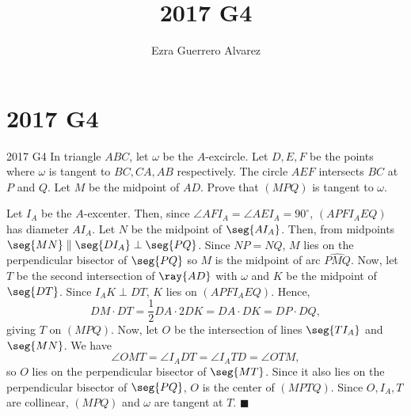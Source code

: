 \documentclass[14pt]{article}
\title{2017 G4}
\author{Ezra Guerrero Alvarez}
\begin{document}
\maketitle
	
\section*{2017 G4}

\begin{statement}{2017 G4}
	In triangle $ABC$, let $\omega$ be the $A$-excircle. Let $D,E,F$ be the points where $\omega$ is tangent to $BC,CA,AB$ respectively. The circle $AEF$ intersects $BC$ at $P$ and $Q$. Let $M$ be the midpoint of $AD$. Prove that $(MPQ)$ is tangent to $\omega$.
\end{statement}
Let $I_A$ be the $A$-excenter. Then, since $\angle AFI_A=\angle AEI_A=90^{\circ}$, $(APFI_AEQ)$ has diameter $AI_A$. Let $N$ be the midpoint of $\seg{AI_A}$. Then, from midpoints $\seg{MN}\parallel\seg{DI_A}\perp\seg{PQ}$. Since $NP=NQ$, $M$ lies on the perpendicular bisector of $\seg{PQ}$ so $M$ is the midpoint of arc $\widehat{PMQ}$. Now, let $T$ be the second intersection of $\ray{AD}$ with $\omega$ and $K$ be the midpoint of $\seg{DT}$. Since $I_AK\perp DT$, $K$ lies on $(APFI_AEQ)$. Hence, 
\[ DM\cdot DT=\frac12 DA\cdot 2DK=DA\cdot DK=DP\cdot DQ, \]
giving $T$ on $(MPQ)$. Now, let $O$ be the intersection of lines $\seg{TI_A}$ and $\seg{MN}$. We have 
\[\angle OMT = \angle I_ADT = \angle I_ATD = \angle OTM,\] 
so $O$ lies on the perpendicular bisector of $\seg{MT}$. Since it also lies on the perpendicular bisector of $\seg{PQ}$, $O$ is the center of $(MPTQ)$. Since $O,I_A,T$ are collinear, $(MPQ)$ and $\omega$ are tangent at $T$. $\blacksquare$ 
	
\end{document}
